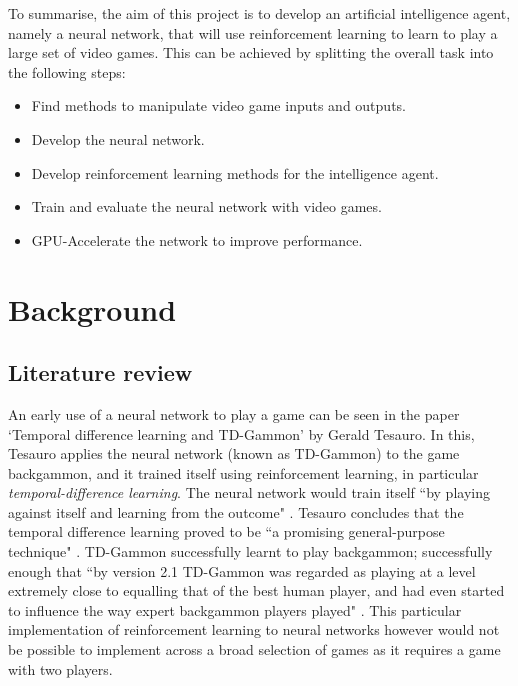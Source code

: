 \documentclass[10pt]{article}
\begin{document}
	To summarise, the aim of this project is to develop an artificial intelligence agent, namely a neural network, that will use reinforcement learning to learn to play a large set of video games. This can be achieved by splitting the overall task into the following steps:
	
	\begin{itemize}
		\item Find methods to manipulate video game inputs and outputs.
		\item Develop the neural network.
		\item Develop reinforcement learning methods for the intelligence agent.
		\item Train and evaluate the neural network with video games.
		\item GPU-Accelerate the network to improve performance.
	\end{itemize}
	
	\bigskip

\section{Background}
	\subsection{Literature review}
	
		
		An early use of a neural network to play a game can be seen in the paper `Temporal difference learning and TD-Gammon' by Gerald Tesauro. In this, Tesauro applies the neural network (known as TD-Gammon) to the game backgammon, and it trained itself using reinforcement learning, in particular \textit{temporal-difference learning}. The neural network would train itself ``by playing against itself and learning from the outcome" \cite{tdgammon}. Tesauro concludes that the temporal difference learning proved to be ``a promising general-purpose technique" \cite{tdgammon}. TD-Gammon successfully learnt to play backgammon; successfully enough that ``by version 2.1 TD-Gammon was regarded as playing at a level extremely close to equalling that of the best human player, and had even started to influence the way expert backgammon players played" \cite{tdgammon}. This particular implementation of reinforcement learning to neural networks however would not be possible to implement across a broad selection of games as it requires a game with two players.\\
		
\end{document}
